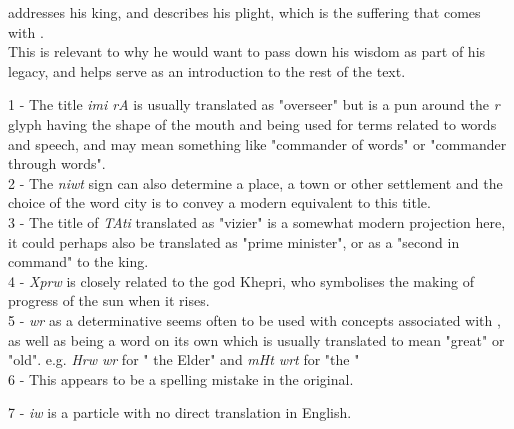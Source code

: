 \vspace*{\fill}

 addresses his king,  and describes his plight, which is the suffering that comes with .\\

This is relevant to why he would want to pass down his wisdom as part of his legacy, and helps serve as an introduction to the rest of the text.\\

\vspace*{\fill}

1 - The title \textit{imi rA} is usually translated as "overseer" but is a pun around the \textit{r} glyph having the shape of the mouth and being used for terms related to words and speech, and may mean something like "commander of words" or "commander through words".\\

2 - The \textit{niwt} sign can also determine a place, a town or other settlement and the choice of the word city is to convey a modern equivalent to this title.\\

3 - The title of \textit{TAti} translated as "vizier" is a somewhat modern projection here, it could perhaps also be translated as "prime minister", or as a "second in command" to the king.\\

4 - \textit{Xprw} is closely related to the god Khepri, who symbolises the making of progress of the sun when it rises.\\

5 - \textit{wr} as a determinative seems often to be used with concepts associated with \textit{}, as well as being a word on its own which is usually translated to mean "great" or "old". e.g. \textit{Hrw wr} for " the Elder" and \textit{mHt wrt} for "the " \\

6 - This appears to be a spelling mistake in the original.

7 - \textit{iw} is a particle with no direct translation in English.

\vspace*{\fill}

\pagebreak

\vspace*{\fill}

